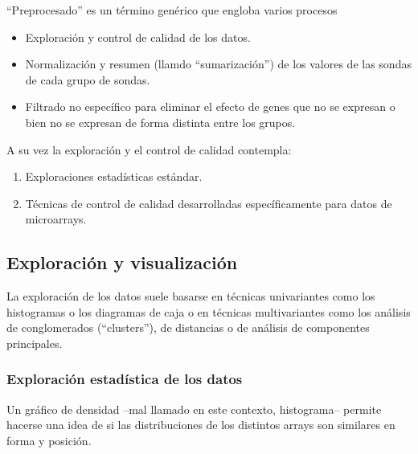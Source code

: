 \documentclass[a4paper]{article}\usepackage[]{graphicx}\usepackage[]{color}
\begin{document}
``Preprocesado'' es un término genérico que engloba varios procesos
\begin{itemize}
\item Exploración y control de calidad de los datos.
\item Normalización y resumen (llamdo ``sumarización'') de los valores de las sondas de cada grupo de sondas.
\item Filtrado no específico para eliminar el efecto de genes que no se expresan o bien no se expresan de forma distinta entre los grupos.
\end{itemize}

A su vez la exploración y el control de calidad contempla:
\begin{enumerate}
\item Exploraciones estadísticas estándar.
\item Técnicas de control de calidad desarrolladas específicamente para datos de microarrays.
\end{enumerate}

\subsection{Exploración y visualización}

La exploración de los datos suele basarse en técnicas univariantes
como los histogramas o los diagramas de caja o en técnicas
multivariantes como los análisis de conglomerados (``clusters''), de
distancias o de análisis de componentes principales.

\subsubsection{Exploración estadística de los datos}



Un gráfico de densidad --mal llamado en este contexto, histograma--
permite hacerse una idea de si las distribuciones de los distintos
arrays son similares en forma y posición.
\end{document}
